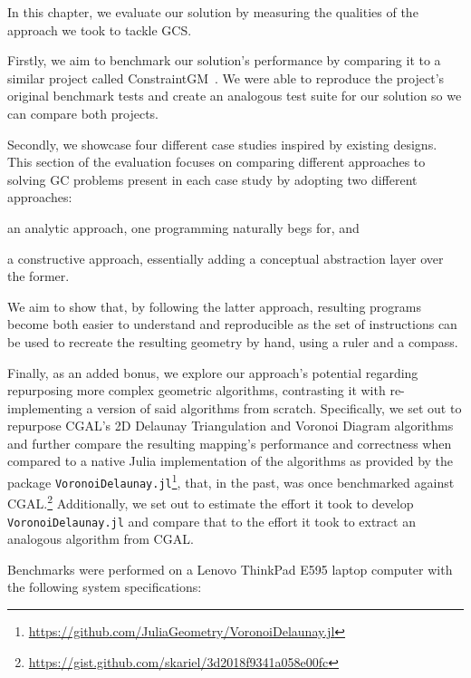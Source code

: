 %
\label{chap:eval}
\cleardoublepage{}

\noindent In this chapter, we evaluate our solution by measuring the qualities
of the approach we took to tackle \ac{GCS}.

Firstly, we aim to benchmark our solution's performance by comparing it to a
similar project called ConstraintGM~\cite{Pinheiro:2016:MGR}.  We were able to
reproduce the project's original benchmark tests and create an analogous test
suite for our solution so we can compare both projects.

Secondly, we showcase four different case studies inspired by existing designs.
This section of the evaluation focuses on comparing different approaches to
solving \ac{GC} problems present in each case study by adopting two different
approaches: 
\begin{enumerate*}[label= (\arabic*)]
  \item an analytic approach, one programming naturally begs for, and 
  \item a constructive approach, essentially adding a conceptual abstraction
  layer over the former.
\end{enumerate*}
We aim to show that, by following the latter approach, resulting programs become
both easier to understand and reproducible as the set of instructions can be
used to recreate the resulting geometry by hand, using a ruler and a compass.

Finally, as an added bonus, we explore our approach's potential regarding
repurposing more complex geometric algorithms, contrasting it with
re-implementing a version of said algorithms from scratch.  Specifically, we set
out to repurpose \ac{CGAL}'s 2D Delaunay Triangulation and Voronoi Diagram
algorithms and further compare the resulting mapping's performance and
correctness when compared to a native Julia implementation of the algorithms as
provided by the package
\texttt{VoronoiDelaunay.jl}\footnote{\url{https://github.com/JuliaGeometry/VoronoiDelaunay.jl}},
that, in the past, was once benchmarked against
\ac{CGAL}.\footnote{\url{https://gist.github.com/skariel/3d2018f9341a058e00fc}}
Additionally, we set out to estimate the effort it took to develop
\texttt{VoronoiDelaunay.jl} and compare that to the effort it took to extract an
analogous algorithm from \ac{CGAL}.

Benchmarks were performed on a Lenovo{\textregistered}
ThinkPad{\textregistered} E595 laptop computer with the following
system specifications:

